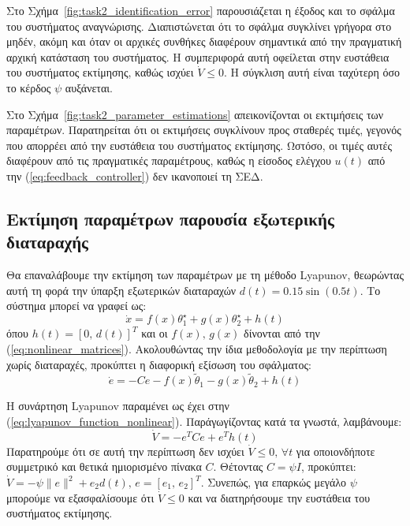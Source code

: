 \documentclass[a4paper,12pt]{article}
\begin{document}
Στο Σχήμα~\ref{fig:task2_identification_error} παρουσιάζεται η έξοδος και το σφάλμα του συστήματος αναγνώρισης.
Διαπιστώνεται ότι το σφάλμα συγκλίνει γρήγορα στο μηδέν, ακόμη και όταν οι αρχικές συνθήκες διαφέρουν σημαντικά
από την πραγματική αρχική κατάσταση του συστήματος. Η συμπεριφορά αυτή οφείλεται στην ευστάθεια του συστήματος
εκτίμησης, καθώς ισχύει $\dot{V} \leq 0$. Η σύγκλιση αυτή είναι ταχύτερη όσο το κέρδος $\psi$ αυξάνεται. 

Στο Σχήμα~\ref{fig:task2_parameter_estimations} απεικονίζονται οι εκτιμήσεις των παραμέτρων. Παρατηρείται ότι
οι εκτιμήσεις συγκλίνουν προς σταθερές τιμές, γεγονός που απορρέει από την ευστάθεια του συστήματος εκτίμησης.
Ωστόσο, οι τιμές αυτές διαφέρουν από τις πραγματικές παραμέτρους, καθώς η είσοδος ελέγχου $u(t)$ από την 
(\ref{eq:feedback_controller}) δεν ικανοποιεί τη ΣΕΔ.

\subsection*{Εκτίμηση παραμέτρων παρουσία εξωτερικής διαταραχής}

Θα επαναλάβουμε την εκτίμηση των παραμέτρων με τη μέθοδο Lyapunov,
θεωρώντας αυτή τη φορά την ύπαρξη εξωτερικών διαταραχών $d(t) = 0.15 \sin(0.5 t)$. Το 
σύστημα μπορεί να γραφεί ως:
\begin{equation}
    \dot{x} = f(x)\theta_1^{\star} + g(x)\theta_2^{\star} + h(t)
    \label{eq:eq:roll_angle_system_2}
\end{equation}
όπου $h(t) = [0,\, d(t)]^T$ και οι $f(x),\, g(x)$ δίνονται από την (\ref{eq:nonlinear_matrices}). Ακολουθώντας
την ίδια μεθοδολογία με την περίπτωση χωρίς διαταραχές, προκύπτει η διαφορική εξίσωση του σφάλματος:
\begin{equation}
    \dot{e} = -C e - f(x)\tilde{\theta}_1 - g(x)\tilde{\theta}_2 + h(t)
    \label{eq:lyapunov_nonlinear_identification_error_derivative}
\end{equation}

Η συνάρτηση Lyapunov παραμένει ως έχει στην 
(\ref{eq:lyapunov_function_nonlinear}). Παράγωγίζοντας κατά τα γνωστά, λαμβάνουμε:
\begin{equation}
    \dot{V} = -e^T C e + e^T h(t)
    \label{eq:lyapunov_derivative_nonlinear_disturbances}
\end{equation}
Παρατηρούμε ότι σε αυτή την περίπτωση δεν ισχύει $\dot{V} \leq 0, \, \forall t$ για οποιονδήποτε συμμετρικό και 
θετικά ημιορισμένο πίνακα $C$. Θέτοντας $C = \psi I$, προκύπτει: 
$\dot{V} = -\psi \|e\|^2 + e_2 d(t), \, e = [e_1,\, e_2]^T$. Συνεπώς, για επαρκώς μεγάλο $\psi$ μπορούμε να 
εξασφαλίσουμε ότι $\dot{V} \leq 0$ και να διατηρήσουμε την ευστάθεια του συστήματος εκτίμησης.
\end{document}

